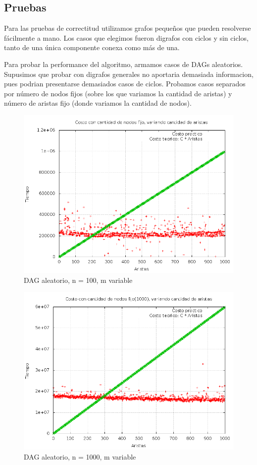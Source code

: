 \subsection{Pruebas}
Para las pruebas de correctitud utilizamos grafos peque\~nos que pueden resolverse f\'acilmente a mano. 
Los casos que elegimos fueron digrafos con ciclos y sin ciclos, tanto de una \'unica componente conexa como m\'as de una.


Para probar la performance del algoritmo, armamos casos de DAGs aleatorios. Supusimos que probar con digrafos generales no aportaria demasiada informacion, pues podrian presentarse demasiados casos de ciclos. Probamos casos separados por n\'umero de nodos fijos (sobre los que variamos la cantidad de aristas) y n\'umero de aristas fijo (donde variamos la cantidad de nodos). 


\begin{figure}[H]
	\centering
	\includegraphics[scale=0.5]{dag_100.png}
	\caption{DAG aleatorio, n = 100, m variable}
\end{figure}

\begin{figure}[H]
	\centering
	\includegraphics[scale=0.5]{dag_1000.png}
	\caption{DAG aleatorio, n = 1000, m variable}
\end{figure}



